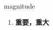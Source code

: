 
\begin{frame}
{\huge magnitude}
\begin{center}
\begin{enumerate}\Large
  \item \textbf{重要，重大}
\end{enumerate}
\end{center}
\end{frame}
